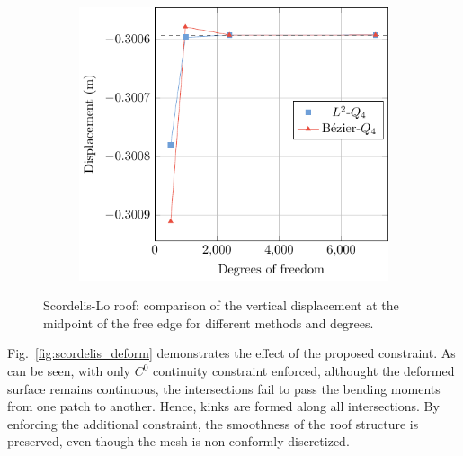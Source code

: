 \documentclass[preprint,12pt]{elsarticle}
\theoremstyle{remark}
\begin{document}
\begin{figure}[!hbt]
\begin{subfigure}[b]{.32\textwidth}
        \caption{}
    \end{subfigure}
    \begin{subfigure}[b]{.32\textwidth}
        \centering
        \includegraphics[width = \textwidth]{Scordelis-Lo-p=4}
        \caption{}
    \end{subfigure}
	\caption{Scordelis-Lo roof: comparison of the vertical displacement at the midpoint of the free edge for different methods and degrees.}\label{fig:scordelis_converge}
\end{figure}

Fig.~\ref{fig:scordelis_deform} demonstrates the effect of the proposed constraint. As can be seen, with only $C^0$ continuity constraint enforced, althought the deformed surface remains continuous, the intersections fail to pass the bending moments from one patch to another. Hence, kinks are formed along all intersections. By enforcing the additional constraint, the smoothness of the roof structure is preserved, even though the mesh is non-conformly discretized. 
\end{document}
